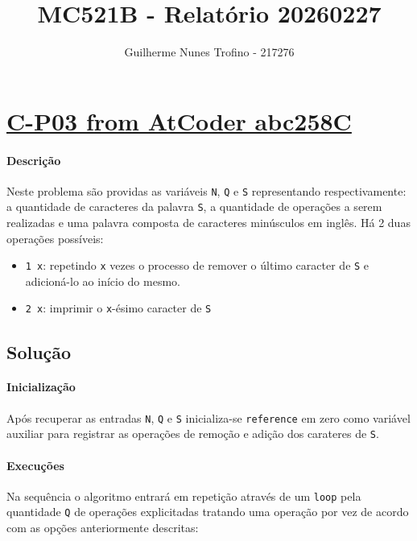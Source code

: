 \documentclass[a4paper]{article}
\author{Guilherme Nunes Trofino - 217276}
\title{MC521B - Relatório 20260227}
\begin{document}
\maketitle
\section{\href{https://atcoder.jp/contests/abc258/tasks/abc258_c}{C-P03 from AtCoder abc258C}}
\paragraph{Descrição} Neste problema são providas as variáveis \texttt{N}, \texttt{Q} e \texttt{S} representando respectivamente: a quantidade de caracteres da palavra \texttt{S}, a quantidade de operações a serem realizadas e uma palavra composta de caracteres minúsculos em inglês. Há 2 duas operações possíveis:

\begin{itemize}
    \item \texttt{1 x}: repetindo \texttt{x} vezes o processo de remover o último caracter de \texttt{S} e adicioná-lo ao início do mesmo.
    \item \texttt{2 x}: imprimir o \texttt{x}-ésimo caracter de \texttt{S}
\end{itemize}


\subsection{Solução}

\paragraph{Inicialização} Após recuperar as entradas \texttt{N}, \texttt{Q} e \texttt{S} inicializa-se \texttt{reference} em zero como variável auxiliar para registrar as operações de remoção e adição dos carateres de \texttt{S}.

\paragraph{Execuções} Na sequência o algoritmo entrará em repetição através de um \texttt{loop} pela quantidade \texttt{Q} de operações explicitadas tratando uma operação por vez de acordo com as opções anteriormente descritas:
\end{document}

